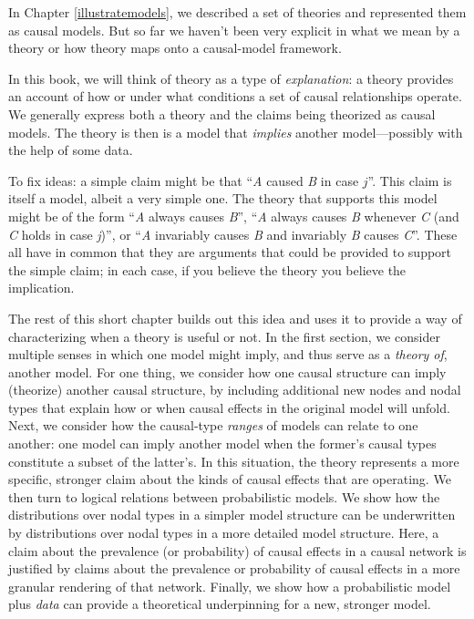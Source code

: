 \documentclass[
  12pt,
]{book}
\begin{document}
In Chapter \ref{illustratemodels}, we described a set of theories and represented them as causal models. But so far we haven't been very explicit in what we mean by a theory or how theory maps onto a causal-model framework.

In this book, we will think of theory as a type of \emph{explanation}: a theory provides an account of how or under what conditions a set of causal relationships operate. We generally express both a theory and the claims being theorized as causal models. The theory is then is a model that \emph{implies} another model---possibly with the help of some data.

To fix ideas: a simple claim might be that ``\emph{A} caused \emph{B} in case \(j\)''. This claim is itself a model, albeit a very simple one. The theory that supports this model might be of the form ``\emph{A} always causes \emph{B}'', ``\emph{A} always causes \emph{B} whenever \emph{C} (and \emph{C} holds in case \emph{j})'', or ``\emph{A} invariably causes \emph{B} and invariably \emph{B} causes \emph{C}''. These all have in common that they are arguments that could be provided to support the simple claim; in each case, if you believe the theory you believe the implication.

The rest of this short chapter builds out this idea and uses it to provide a way of characterizing when a theory is useful or not.
In the first section, we consider multiple senses in which one model might imply, and thus serve as a \emph{theory of}, another model. For one thing, we consider how one causal structure can imply (theorize) another causal structure, by including additional new nodes and nodal types that explain how or when causal effects in the original model will unfold. Next, we consider how the causal-type \emph{ranges} of models can relate to one another: one model can imply another model when the former's causal types constitute a subset of the latter's. In this situation, the theory represents a more specific, stronger claim about the kinds of causal effects that are operating. We then turn to logical relations between probabilistic models. We show how the distributions over nodal types in a simpler model structure can be underwritten by distributions over nodal types in a more detailed model structure. Here, a claim about the prevalence (or probability) of causal effects in a causal network is justified by claims about the prevalence or probability of causal effects in a more granular rendering of that network. Finally, we show how a probabilistic model plus \emph{data} can provide a theoretical underpinning for a new, stronger model.
\end{document}
